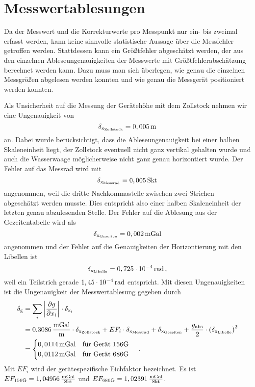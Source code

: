 \section{Messwertablesungen}

Da der Messwert und die Korrekturwerte pro Messpunkt nur ein- bis zweimal erfasst werden, kann keine sinnvolle statistische Aussage über die Messfehler getroffen werden. Stattdessen kann ein Größtfehler abgeschätzt werden, der aus den einzelnen Ableseungenauigkeiten der Messwerte mit Größtfehlerabschätzung berechnet werden kann. Dazu muss man sich überlegen, wie genau die einzelnen Messgrößen abgelesen werden konnten und wie genau die Messgerät positioniert werden konnten.

Als Unsicherheit auf die Messung der Gerätehöhe mit dem Zollstock nehmen wir eine Ungenauigkeit von
\begin{equation}
 \delta_{\mathrm{x_{\mathrm{Zollstock}}}}=0,005\,\mathrm{m}
\end{equation}
an. Dabei wurde berücksichtigt, dass die Ableseungenauigkeit bei einer halben Skaleneinheit liegt, der Zollstock eventuell nicht ganz vertikal gehalten wurde und auch die Wasserwaage möglicherweise nicht ganz genau horizontiert wurde. Der Fehler auf das Messrad wird mit
\begin{equation}
 \delta_{\mathrm{x_{\mathrm{Messrad}}}}=0,005\,\mathrm{Skt}
\end{equation}
angenommen, weil die dritte Nachkommastelle zwischen zwei Strichen abgeschätzt werden musste. Dies entspricht also einer halben Skaleneinheit der letzten genau abzulesenden Stelle. Der Fehler auf die Ablesung aus der Gezeitentabelle wird als
\begin{equation}
 \delta_{\mathrm{x_{\mathrm{Gezeiten}}}}=0,002\,\mathrm{mGal}
\end{equation}
angenommen und der Fehler auf die Genauigkeiten der Horizontierung  mit den Libellen ist
\begin{equation}
 \delta_{\mathrm{x_{\mathrm{Libelle}}}}=0,725\cdot 10^{-4}\,\mathrm{rad} \text{\,,}
\end{equation}
weil ein Teilstrich gerade $1,45\cdot 10^{-4}\,\mathrm{rad}$ entspricht.
Mit diesen Ungenauigkeiten ist die Ungenauigkeit der Messwertablesung gegeben durch
\begin{align}
 \delta_{\mathrm{g}}&=\sum_i \left| \frac{\partial g}{\partial x_i} \right|\cdot \delta_{\mathrm{x_i}} \\
 &=0.3086\,\frac{\mathrm{mGal}}{\mathrm{m}}\cdot \delta_{\mathrm{x_{\mathrm{Zollstock}}}} + EF_i \cdot \delta_{\mathrm{x_{\mathrm{Messrad}}}} +
 \delta_{\mathrm{x_{\mathrm{Gezeiten}}}} + \frac{g_{\mathrm{abs}}}{2} \cdot \left( \delta_{\mathrm{x_{\mathrm{Libelle}}}} \right)^2 \\
 &= \begin{cases}
     0,0114\,\mathrm{mGal} \quad \text{für Gerät 156G}\\
     0,0112\,\mathrm{mGal} \quad \text{für Gerät 686G}
    \end{cases}
 \text{\,.}
\end{align}
Mit $EF_i$ wird der gerätespezifische Eichfaktor bezeichnet. Es ist $EF_{\mathrm{156G}}=1,04956\,\frac{\mathrm{mGal}}{\mathrm{Skt}}$ und $EF_{\mathrm{686G}}=1,02391\,\frac{\mathrm{mGal}}{\mathrm{Skt}}$.

